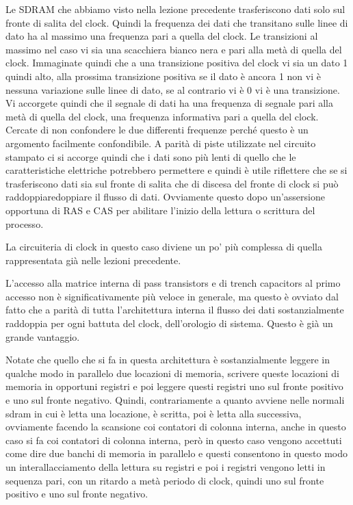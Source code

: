 Le SDRAM che abbiamo visto nella lezione precedente trasferiscono dati solo sul fronte di salita del clock.
Quindi la frequenza dei dati che transitano sulle linee di dato ha al massimo una frequenza pari a quella del clock.
Le transizioni al massimo nel caso vi sia una scacchiera bianco nera e pari alla metà di quella del clock.
Immaginate quindi che a una transizione positiva del clock vi sia un dato 1 quindi alto, alla prossima transizione positiva se il dato è ancora 1 non vi è nessuna variazione sulle linee di dato, se al contrario vi è 0 vi è una transizione.
Vi accorgete quindi che il segnale di dati ha una frequenza di segnale pari alla metà di quella del clock, una frequenza informativa pari a quella del clock.
Cercate di non confondere le due differenti frequenze perché questo è un argomento facilmente confondibile.
A parità di piste utilizzate nel circuito stampato ci si accorge quindi che i dati sono più lenti di quello che le caratteristiche elettriche potrebbero permettere e quindi è utile riflettere che se si trasferiscono dati sia sul fronte di salita che di discesa del fronte di clock si può raddoppiaredoppiare il flusso di dati.
Ovviamente questo dopo un'assersione opportuna di RAS e CAS per abilitare l'inizio della lettura o scrittura del processo.

La circuiteria di clock in questo caso diviene un po' più complessa di quella rappresentata già nelle lezioni precedente.

L'accesso alla matrice interna di pass transistors e di trench capacitors al primo accesso non è significativamente più veloce in generale, ma questo è ovviato dal fatto che a parità di tutta l'architettura interna il flusso dei dati sostanzialmente raddoppia per ogni battuta del clock, dell'orologio di sistema. Questo è già un grande vantaggio.

Notate che quello che si fa in questa architettura è sostanzialmente leggere in qualche modo in parallelo due locazioni di memoria, scrivere queste locazioni di memoria in opportuni registri e poi leggere questi registri uno sul fronte positivo e uno sul fronte negativo.
Quindi, contrariamente a quanto avviene nelle normali sdram in cui è letta una locazione, è scritta, poi è letta alla successiva, ovviamente facendo la scansione coi contatori di colonna interna, anche in questo caso si fa coi contatori di colonna interna, però in questo caso vengono accettuti come dire due banchi di memoria in parallelo e questi consentono in questo modo un interallacciamento della lettura su registri e poi i registri vengono letti in sequenza pari, con un ritardo a metà periodo di clock, quindi uno sul fronte positivo e uno sul fronte negativo.

